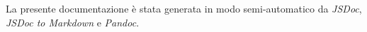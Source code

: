 La presente documentazione è stata generata in modo semi-automatico da
\emph{JSDoc}, \emph{JSDoc to Markdown} e \emph{Pandoc}.

